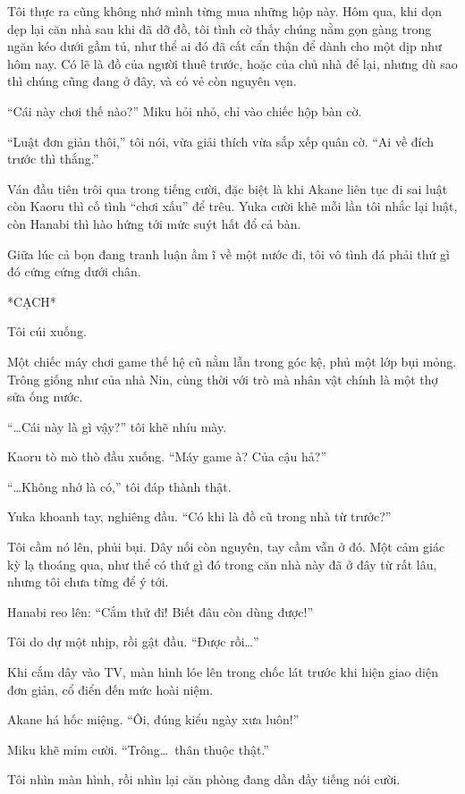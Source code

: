 \documentclass[../main.tex]{subfiles}
\begin{document}
Tôi thực ra cũng không nhớ mình từng mua những hộp này. Hôm qua, khi dọn dẹp lại căn nhà sau khi đã dỡ đồ, tôi tình cờ thấy chúng nằm gọn gàng trong ngăn kéo dưới gầm tủ, như thể ai đó đã cất cẩn thận để dành cho một dịp như hôm nay. Có lẽ là đồ của người thuê trước, hoặc của chủ nhà để lại, nhưng dù sao thì chúng cũng đang ở đây, và có vẻ còn nguyên vẹn.

``Cái này chơi thế nào?'' Miku hỏi nhỏ, chỉ vào chiếc hộp bàn cờ.

``Luật đơn giản thôi,'' tôi nói, vừa giải thích vừa sắp xếp quân cờ. ``Ai về đích trước thì thắng.''

Ván đầu tiên trôi qua trong tiếng cười, đặc biệt là khi Akane liên tục đi sai luật còn Kaoru thì cố tình ``chơi xấu'' để trêu. Yuka cười khẽ mỗi lần tôi nhắc lại luật, còn Hanabi thì hào hứng tới mức suýt hất đổ cả bàn.

Giữa lúc cả bọn đang tranh luận ầm ĩ về một nước đi, tôi vô tình đá phải thứ gì đó cứng cứng dưới chân.

*CẠCH*

Tôi cúi xuống.

Một chiếc máy chơi game thế hệ cũ nằm lẫn trong góc kệ, phủ một lớp bụi mỏng. Trông giống như của nhà Nin, cùng thời với trò mà nhân vật chính là một thợ sửa ống nước.

``\dots Cái này là gì vậy?'' tôi khẽ nhíu mày.

Kaoru tò mò thò đầu xuống. ``Máy game à? Của cậu hả?''

``\dots Không nhớ là có,'' tôi đáp thành thật.

Yuka khoanh tay, nghiêng đầu. ``Có khi là đồ cũ trong nhà từ trước?''

Tôi cầm nó lên, phủi bụi. Dây nối còn nguyên, tay cầm vẫn ở đó. Một cảm giác kỳ lạ thoáng qua, như thể có thứ gì đó trong căn nhà này đã ở đây từ rất lâu, nhưng tôi chưa từng để ý tới.

Hanabi reo lên: ``Cắm thử đi! Biết đâu còn dùng được!''

Tôi do dự một nhịp, rồi gật đầu. ``Được rồi\dots''

Khi cắm dây vào TV, màn hình lóe lên trong chốc lát trước khi hiện giao diện đơn giản, cổ điển đến mức hoài niệm.

Akane há hốc miệng. ``Ôi, đúng kiểu ngày xưa luôn!''

Miku khẽ mỉm cười. ``Trông\dots\ thân thuộc thật.''

Tôi nhìn màn hình, rồi nhìn lại căn phòng đang dần đầy tiếng nói cười.
\end{document}
